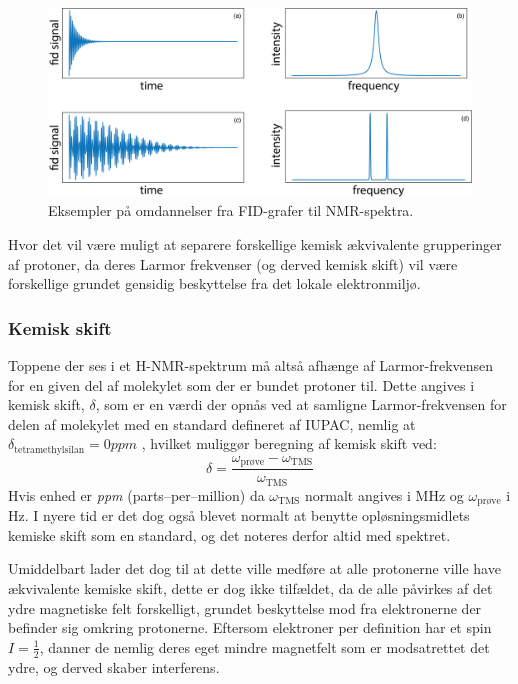     \begin{figure}[H]
        \includegraphics[width=\textwidth]{billeder/fourier}
        \caption{Eksempler på omdannelser fra FID-grafer til NMR-spektra.}
    \end{figure}
    Hvor det vil være muligt at separere forskellige kemisk ækvivalente grupperinger af protoner, da deres Larmor frekvenser (og derved kemisk skift) vil være forskellige grundet gensidig beskyttelse fra det lokale elektronmiljø.

    \subsubsection{Kemisk skift}
    Toppene der ses i et H-NMR-spektrum må altså afhænge af Larmor-frekvensen for en given del af molekylet som der er bundet protoner til. Dette angives i kemisk skift, $\delta$, som er en værdi der opnås ved at samligne Larmor-frekvensen for delen af molekylet med en standard defineret af IUPAC, nemlig at $\delta_{\text{tetramethylsilan}}=0\si{ppm}$ \parencite{Robi2009}, hvilket muliggør beregning af kemisk skift ved:
    \[
        \delta = \frac{\omega_{\text{prøve}}-\omega_{\text{TMS}}}{\omega_{\text{TMS}}}
    \]
    Hvis enhed er \textit{ppm} (parts--per--million) da $\omega_{\text{TMS}}$ normalt angives i MHz og  $\omega_{\text{prøve}}$ i Hz. I nyere tid er det dog også blevet normalt at benytte opløsningsmidlets kemiske skift som en standard, og det noteres derfor altid med spektret.

    Umiddelbart lader det dog til at dette ville medføre at alle protonerne ville have ækvivalente kemiske skift, dette er dog ikke tilfældet, da de alle påvirkes af det ydre magnetiske felt forskelligt, grundet beskyttelse mod fra elektronerne der befinder sig omkring protonerne. Eftersom elektroner per definition har et spin $I=\frac{1}{2}$, danner de nemlig deres eget mindre magnetfelt som er modsatrettet det ydre, og derved skaber interferens.

